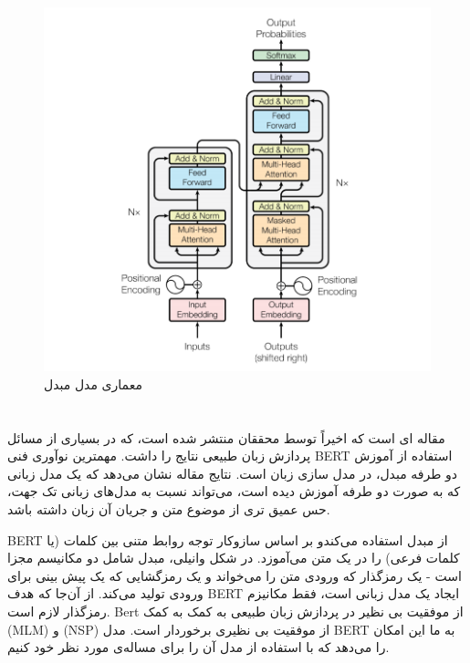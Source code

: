\begin{figure}[H]
\centering
\includegraphics[width=15cm]{figs/Transformer.png}

\caption{  معماری مدل مبدل \cite{Ashish2017Attention}}\label{RNN}
\label{fig:test}
\end{figure}







\section{}
\cite{Jacob2019Bert}
\cite{RoBERTa}
مقاله ای است که اخیراً توسط محققان  منتشر شده است، که در بسیاری از مسائل  پردازش زبان طبیعی
نتایج را داشت.
مهمترین نوآوری فنی BERT استفاده از آموزش دو طرفه مبدل، در مدل سازی زبان است.
نتایج مقاله نشان می‌دهد که یک مدل زبانی که به صورت دو طرفه آموزش دیده است، می‌تواند نسبت به مدل‌های زبانی تک جهت، حس عمیق تری از موضوع متن و جریان آن زبان داشته باشد.

BERT از مبدل استفاده می‌کندو بر اساس سازوکار توجه  روابط متنی بین کلمات (یا کلمات فرعی) را در یک متن می‌آموزد. در شکل وانیلی، مبدل شامل دو مکانیسم مجزا است - یک رمزگذار که ورودی متن را می‌خواند و یک رمزگشایی که یک پیش بینی برای ورودی تولید می‌کند. از آن‌جا که هدف BERT ایجاد یک مدل زبانی است، فقط مکانیزم رمزگذار لازم است.
Bert از موفقیت بی نظیر در پردازش زبان طبیعی به کمک
به کمک 
(MLM) و
(NSP) از موفقیت بی نظیری برخوردار است.
مدل BERT به ما این امکان را می‌دهد که با استفاده از مدل
آن را برای مساله‌ی مورد نظر خود 
کنیم.

